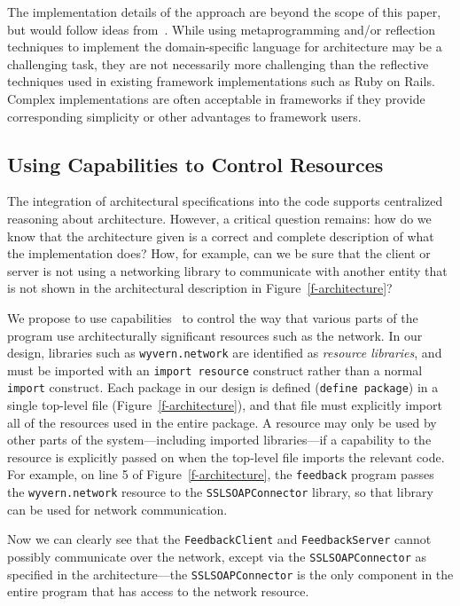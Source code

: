 \documentclass[runningheads]{llncs}
\begin{document}
\begin{sloppypar}
The implementation details of the approach are beyond the scope of this paper, but would follow ideas from~\cite{ASCN03,TSLs-ECOOP14}.  While using metaprogramming and/or reflection techniques to implement the domain-specific language for architecture may be a challenging task, they are not necessarily more challenging than the reflective techniques used in existing framework implementations such as Ruby on Rails.  Complex implementations are often acceptable in frameworks if they provide corresponding simplicity or other advantages to framework users.


\subsection{Using Capabilities to Control Resources}

The integration of architectural specifications into the code supports centralized reasoning about architecture.  However, a critical question remains: how do we know that the architecture given is a correct and complete description of what the implementation does?  How, for example, can we be sure that the client or server is not using a networking library to communicate with another entity that is not shown in the architectural description in Figure~\ref{f-architecture}?

We propose to use capabilities~\cite{Wulf:1974:HKM:355616.364017} to control the way that various parts of the program use architecturally significant resources such as the network.  In our design, libraries such as \texttt{wyvern.network} are identified as \emph{resource libraries}, and must be imported with an \texttt{import resource} construct rather than a normal \texttt{import} construct.  Each package in our design is defined (\texttt{define package}) in a single top-level file (Figure~\ref{f-architecture}), and that file must explicitly import all of the resources used in the entire package.  A resource may only be used by other parts of the system---including imported libraries---if a capability to the resource is explicitly passed on when the top-level file imports the relevant code.  For example, on line 5 of Figure~\ref{f-architecture}, the \texttt{feedback} program passes the \texttt{wyvern.network} resource to the \texttt{SSLSOAPConnector} library, so that library can be used for network communication.

Now we can clearly see that the \texttt{FeedbackClient} and \texttt{FeedbackServer} cannot possibly communicate over the network, except via the \texttt{SSLSOAPConnector} as specified in the architecture---the \texttt{SSLSOAPConnector} is the only component in the entire program that has access to the network resource.


\end{sloppypar}
\end{document}
